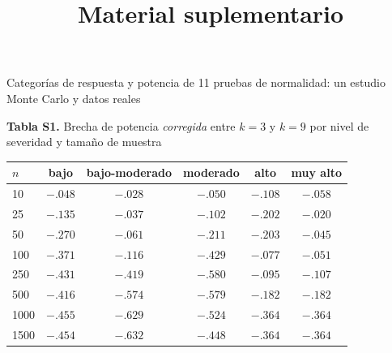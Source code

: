 \documentclass[11pt]{article}
\title{Material suplementario}
\author{}
\date{}
\begin{document}
\maketitle
\begin{center}\small Categorías de respuesta y potencia de 11 pruebas de normalidad: un estudio Monte Carlo y datos reales\end{center}

\begin{table}[h]
\centering
\textbf{Tabla S1.} Brecha de potencia \emph{corregida} entre $k=3$ y $k=9$ por nivel de severidad y tamaño de muestra\par\medskip
\small
\begin{tabular}{lccccc}
\toprule
$n$ & bajo & bajo-moderado & moderado & alto & muy alto \\
\midrule
10 & $-.048$ & $-.028$ & $-.050$ & $-.108$ & $-.058$ \\
25 & $-.135$ & $-.037$ & $-.102$ & $-.202$ & $-.020$ \\
50 & $-.270$ & $-.061$ & $-.211$ & $-.203$ & $-.045$ \\
100 & $-.371$ & $-.116$ & $-.429$ & $-.077$ & $-.051$ \\
250 & $-.431$ & $-.419$ & $-.580$ & $-.095$ & $-.107$ \\
500 & $-.416$ & $-.574$ & $-.579$ & $-.182$ & $-.182$ \\
1000 & $-.455$ & $-.629$ & $-.524$ & $-.364$ & $-.364$ \\
1500 & $-.454$ & $-.632$ & $-.448$ & $-.364$ & $-.364$ \\
\bottomrule
\end{tabular}
\par{}
\end{table}
\end{document}

